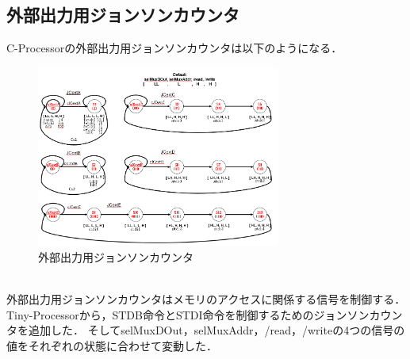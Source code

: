 \documentclass[dvipdfmx]{jarticle}
\begin{document}
\subsection{外部出力用ジョンソンカウンタ}
C-Processorの外部出力用ジョンソンカウンタは以下のようになる．
\begin{figure}[h]
  \centering
  \includegraphics[width = 8cm]{ext.png}
  \caption{外部出力用ジョンソンカウンタ}
\end{figure}
\\外部出力用ジョンソンカウンタはメモリのアクセスに関係する信号を制御する．Tiny-Processorから，STDB命令とSTDI命令を制御するためのジョンソンカウンタを追加した．
そしてselMuxDOut，selMuxAddr，/read，/writeの4つの信号の値をそれぞれの状態に合わせて変動した．
\end{document}
